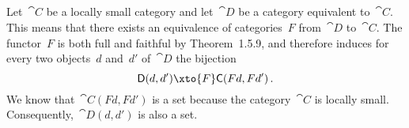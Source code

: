 \subsection{}

Let~$\cat{C}$ be a locally small category and let~$\cat{D}$ be a category equivalent to~$\cat{C}$.
This means that there exists an equivalence of categories~$F$ from~$\cat{D}$ to~$\cat{C}$.
The functor~$F$ is both full and faithful by Theorem~1.5.9, and therefore induces for every two objects~$d$ and~$d'$ of~$\cat{D}$ the bijection
\[
	\cat{D}(d, d') \xto{F} \cat{C}(F d, F d') \,.
\]
We know that~$\cat{C}(F d, F d')$ is a set because the category~$\cat{C}$ is locally small.
Consequently,~$\cat{D}(d, d')$ is also a set.

